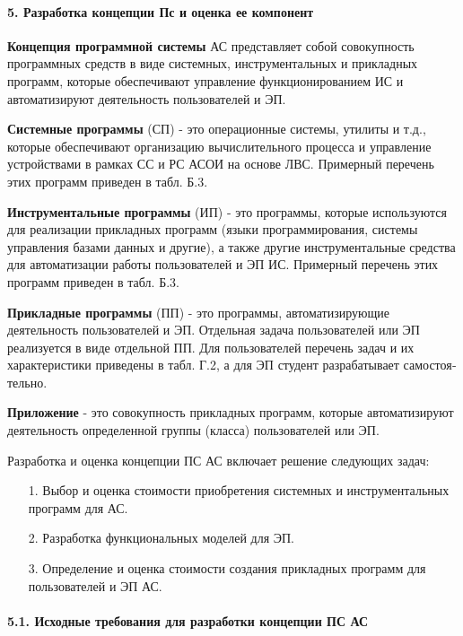 \documentclass[12pt, a4paper, simple]{eskdtext}
\begin{document}
    \newpage

    \paragraph{5. Разработка концепции Пс и оценка ее компонент} \hspace{0pt}

    \textbf{Концепция программной системы} АС представляет собой совокупность программных средств в виде системных,
    инструментальных и прикладных программ,
    которые обеспечивают управление функциони­рованием ИС и автоматизируют деятельность пользователей и ЭП. 
    
    \textbf{Системные программы} (СП) - это операционные системы, утилиты и т.д.,
    которые обес­печивают орга­низацию вычислительного процесса и управление устройствами в рамках СС и РС АСОИ на основе ЛВС.
    Пример­ный пе­речень этих программ приведен в табл. Б.3. 
    
    \textbf{Инструментальные программы} (ИП) - это программы, которые используются для реали­зации приклад­ных программ
    (языки программирования, системы управления ба­зами данных и дру­гие),
    а также дру­гие инст­рументальные средства для автоматизации работы пользователей и ЭП ИС.
    Пример­ный пе­ре­чень этих программ приве­ден в табл. Б.3.
    
    \textbf{Прикладные программы} (ПП) - это программы, автоматизирующие деятельность пользователей и ЭП.
    Отдельная задача пользователей или ЭП реализуется в виде отдельной ПП.
    Для пользователей перечень задач и их характе­ристики приведены в табл. Г.2, а для ЭП студент разрабатывает самостоя­тельно.
    
    \textbf{Приложение} - это совокупность прикладных программ,
    которые автоматизируют деятельность опреде­ленной группы (класса) пользователей или ЭП.
   
    Разработка и оценка концепции ПС АС  включает решение следующих задач:
    \begin{enumerate}
        \item[1.] Выбор и оценка стоимости приобретения системных и инструментальных программ для АС.
        \item[2.] Разработка функциональных моделей для ЭП.
        \item[3.] Определение и оценка стоимости создания приклад­ных программ для пользователей и ЭП АС.
    \end{enumerate}

    \paragraph{5.1. Исходные требования для разработки концепции ПС АС} \hspace{0pt}
    
\end{document}
